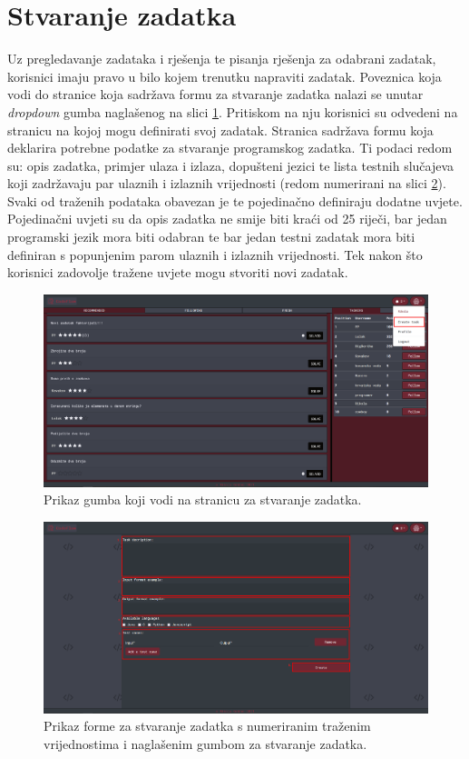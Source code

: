 \documentclass[times, utf8, zavrsni]{fer}
\begin{document}
		\section{Stvaranje zadatka}
		Uz pregledavanje zadataka i rješenja te pisanja rješenja za odabrani zadatak, korisnici imaju pravo u bilo kojem trenutku napraviti zadatak. Poveznica koja vodi do stranice koja sadržava formu za stvaranje zadatka nalazi se unutar \textit{dropdown} gumba naglašenog na slici \ref{fig:dropdowntask}. Pritiskom na nju korisnici su odvedeni na stranicu na kojoj mogu definirati svoj zadatak. Stranica sadržava formu koja deklarira potrebne podatke za stvaranje programskog zadatka. Ti podaci redom su: opis zadatka, primjer ulaza i izlaza, dopušteni jezici te lista testnih slučajeva koji zadržavaju par ulaznih i izlaznih vrijednosti (redom numerirani na slici \ref{fig:stvaranjeforma}). Svaki od traženih podataka obavezan je te pojedinačno definiraju dodatne uvjete. Pojedinačni uvjeti su da opis zadatka ne smije biti kraći od 25 riječi, bar jedan programski jezik mora biti odabran te bar jedan testni zadatak mora biti definiran s popunjenim parom ulaznih i izlaznih vrijednosti. Tek nakon što korisnici zadovolje tražene uvjete mogu stvoriti novi zadatak.
		\begin{figure}[htb]
			\centering
			\includegraphics[width=\linewidth]{pictures/koristenje/StvoriDropdown.png}
			\caption{Prikaz gumba koji vodi na stranicu za stvaranje zadatka.}
			\label{fig:dropdowntask}
		\end{figure}
		\begin{figure}[htb]
			\centering
			\includegraphics[width=\linewidth]{pictures/koristenje/FormaStvaranja.png}
			\caption{Prikaz forme za stvaranje zadatka s numeriranim traženim vrijednostima i naglašenim gumbom za stvaranje zadatka.}
			\label{fig:stvaranjeforma}
		\end{figure}
		
\end{document}

